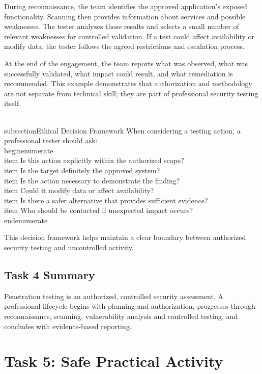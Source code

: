 \documentclass[11pt,a4paper]{article}
\begin{document}
During reconnaissance, the team identifies the approved application's exposed functionality. Scanning then provides information about services and possible weaknesses. The tester analyzes those results and selects a small number of relevant weaknesses for controlled validation. If a test could affect availability or modify data, the tester follows the agreed restrictions and escalation process.

At the end of the engagement, the team reports what was observed, what was successfully validated, what impact could result, and what remediation is recommended. This example demonstrates that authorization and methodology are not separate from technical skill; they are part of professional security testing itself.

\\subsection{Ethical Decision Framework}
When considering a testing action, a professional tester should ask:
\\begin{enumerate}
\\item Is this action explicitly within the authorized scope?
\\item Is the target definitely the approved system?
\\item Is the action necessary to demonstrate the finding?
\\item Could it modify data or affect availability?
\\item Is there a safer alternative that provides sufficient evidence?
\\item Who should be contacted if unexpected impact occurs?
\\end{enumerate}

This decision framework helps maintain a clear boundary between authorized security testing and uncontrolled activity.

\subsection{Task 4 Summary}
Penetration testing is an authorized, controlled security assessment. A professional lifecycle begins with planning and authorization, progresses through reconnaissance, scanning, vulnerability analysis and controlled testing, and concludes with evidence-based reporting.

\newpage
\section{Task 5: Safe Practical Activity}
\end{document}

